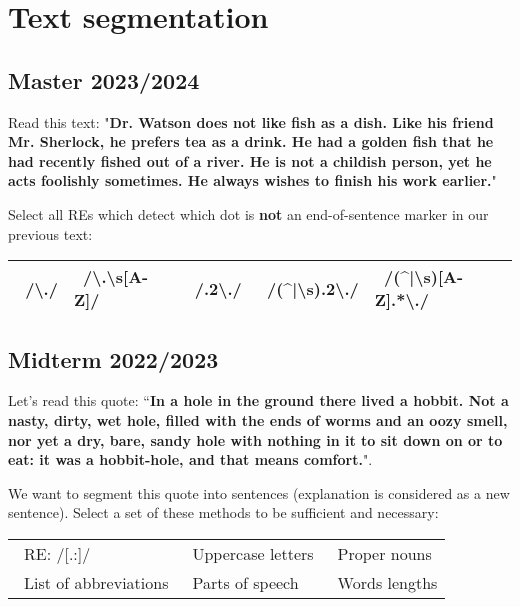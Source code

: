 \documentclass[11pt, a4paper]{article}
\begin{document}
\section{Text segmentation}

\subsection{Master 2023/2024}

Read this text: "\textbf{Dr. Watson does not like fish as a dish. Like his friend Mr. Sherlock, he prefers tea as a drink. He had a golden fish that he had recently fished out of a river.  He is not a childish person, yet he acts foolishly sometimes. He always wishes to finish his work earlier.}"

Select all REs which detect which dot is \textbf{not} an end-of-sentence marker in our previous text:
\begin{center}
	\begin{tabular}{|lllll|}
		\hline
		\Square\ /\textbackslash./ & 
		\Square\ /\textbackslash.\textbackslash s[A-Z]/ & 
		\Square\ /.{2}\textbackslash./ & 
		\Square\ /(\textasciicircum|\textbackslash s).{2}\textbackslash./ &
		\Square\ /(\textasciicircum|\textbackslash s)[A-Z].*\textbackslash./\\
		\hline
	\end{tabular}
\end{center}

\subsection{Midterm 2022/2023}

Let's read this quote: ``\textbf{In a hole in the ground there lived a hobbit. Not a nasty, dirty, wet hole, filled
with the ends of worms and an oozy smell, nor yet a dry, bare, sandy hole with nothing in it to sit down
on or to eat: it was a hobbit-hole, and that means comfort.}".

We want to segment this quote into sentences (explanation is considered as a new sentence). Select a set of these methods to be sufficient and necessary:
\begin{center}
	\begin{tabular}{|lll|}
		\hline
		\Square\ RE: /[.:]/ & 
		\Square\ Uppercase letters & 
		\Square\ Proper nouns \\
		\Square\ List of abbreviations &
		\Square\ Parts of speech &
		\Square\ Words lengths\\
		\hline
	\end{tabular}
\end{center}
\end{document}
